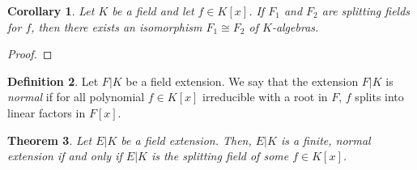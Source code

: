 \documentclass[a4paper, openany]{memoir}
\theoremstyle{definition}
\newtheorem{definition}{Definition}[section]
\theoremstyle{plain}
\newtheorem{theorem}[definition]{Theorem}
\newtheorem{corollary}[definition]{Corollary}
\begin{document}
    \begin{corollary}
        Let $K$ be a field and let $f \in K[x]$. If $F_1$ and $F_2$ are splitting fields for $f$, then there exists an isomorphism $F_1 \cong F_2$ of $K$-algebras.
    \end{corollary}
    \begin{proof}
        
    \end{proof}

    \begin{definition}
        Let $F|K$ be a field extension. We say that the extension $F|K$ is \emph{normal} if for all polynomial $f \in K[x]$ irreducible with a root in $F$, $f$ splits into linear factors in $F[x]$.
    \end{definition}

    \begin{theorem}
        Let $E|K$ be a field extension. Then, $E|K$ is a finite, normal extension if and only if $E|K$ is the splitting field of some $f \in K[x]$.
    \end{theorem}
\end{document}
